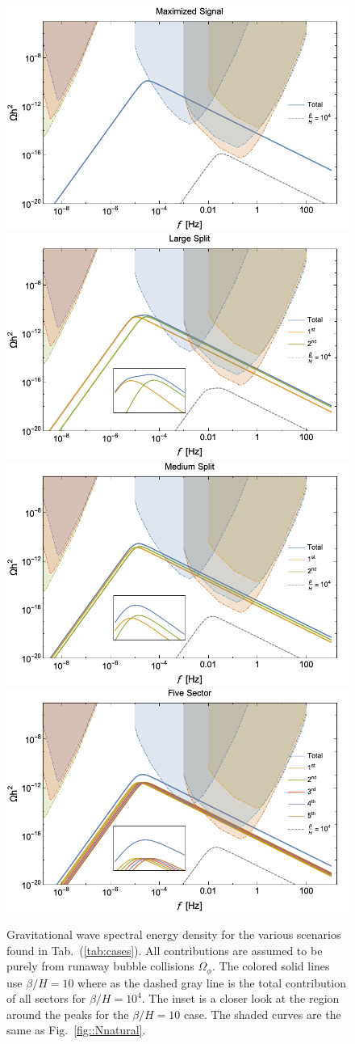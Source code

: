\documentclass[nofootinbib,twocolumn,preprintnumbers]{revtex4-1}
\begin{document}
\begin{figure}[tb]
\centering
\begin{minipage}[c]{\textwidth}
\includegraphics[width=.45\textwidth ]{highest.png}
\hfill
\includegraphics[width=.45\textwidth]{TwoFar.png} 
\hfill
\includegraphics[width=.45\textwidth]{TwoMed.png} 
\hfill
\includegraphics[width=.45\textwidth]{energydensity.png} 
\end{minipage}
\hfill
\caption{ Gravitational wave spectral energy density for the various scenarios found in Tab.~(\ref{tab:cases}).  All contributions are assumed to be purely from runaway bubble collisions $\Omega_{\phi}$. The colored solid lines use $\beta/H  = 10$ where as the dashed gray line is the total contribution of all sectors for $\beta/H  = 10^4$. The inset is a closer look at the region around the peaks for the $\beta/H  = 10$ case. The shaded curves are the same as Fig.~\ref{fig::Nnatural}.   }
\label{fig:Haa}
\end{figure}
\end{document}
